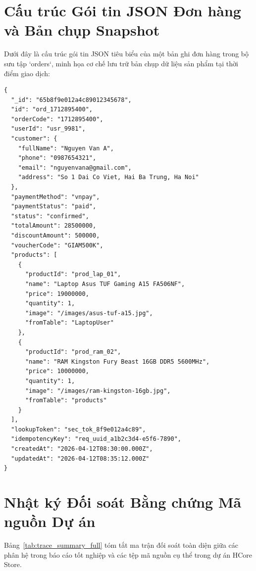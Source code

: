 \documentclass[12pt,a4paper]{report}
\begin{document}
\section{Cấu trúc Gói tin JSON Đơn hàng và Bản chụp Snapshot}
Dưới đây là cấu trúc gói tin JSON tiêu biểu của một bản ghi đơn hàng trong bộ sưu tập `orders`, minh họa cơ chế lưu trữ bản chụp dữ liệu sản phẩm tại thời điểm giao dịch:
\begin{verbatim}
{
  "_id": "65b8f9e012a4c89012345678",
  "id": "ord_1712895400",
  "orderCode": "1712895400",
  "userId": "usr_9981",
  "customer": {
    "fullName": "Nguyen Van A",
    "phone": "0987654321",
    "email": "nguyenvana@gmail.com",
    "address": "So 1 Dai Co Viet, Hai Ba Trung, Ha Noi"
  },
  "paymentMethod": "vnpay",
  "paymentStatus": "paid",
  "status": "confirmed",
  "totalAmount": 28500000,
  "discountAmount": 500000,
  "voucherCode": "GIAM500K",
  "products": [
    {
      "productId": "prod_lap_01",
      "name": "Laptop Asus TUF Gaming A15 FA506NF",
      "price": 19000000,
      "quantity": 1,
      "image": "/images/asus-tuf-a15.jpg",
      "fromTable": "LaptopUser"
    },
    {
      "productId": "prod_ram_02",
      "name": "RAM Kingston Fury Beast 16GB DDR5 5600MHz",
      "price": 10000000,
      "quantity": 1,
      "image": "/images/ram-kingston-16gb.jpg",
      "fromTable": "products"
    }
  ],
  "lookupToken": "sec_tok_8f9e012a4c89",
  "idempotencyKey": "req_uuid_a1b2c3d4-e5f6-7890",
  "createdAt": "2026-04-12T08:30:00.000Z",
  "updatedAt": "2026-04-12T08:35:12.000Z"
}
\end{verbatim}

\section{Nhật ký Đối soát Bằng chứng Mã nguồn Dự án}
Bảng~\ref{tab:trace_summary_full} tóm tắt ma trận đối soát toàn diện giữa các phân hệ trong báo cáo tốt nghiệp và các tệp mã nguồn cụ thể trong dự án HCore Store.
\end{document}
